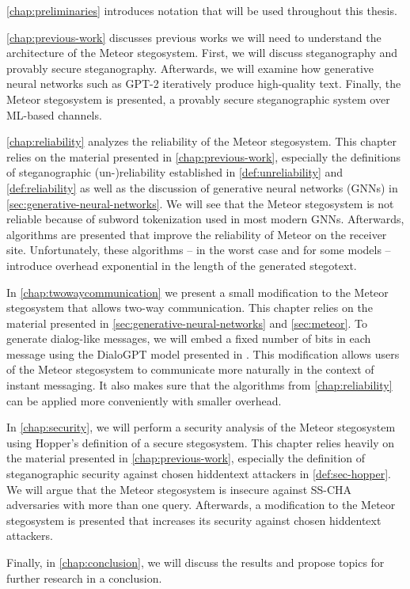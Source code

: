 \autoref{chap:preliminaries} introduces notation that will be used throughout this thesis.

\autoref{chap:previous-work} discusses previous works we will need to understand the architecture of the Meteor stegosystem.
First, we will discuss steganography and provably secure steganography.
Afterwards, we will examine how generative neural networks such as GPT-2 iteratively produce high-quality text.
Finally, the Meteor stegosystem is presented, a provably secure steganographic system over ML-based channels.

\autoref{chap:reliability} analyzes the reliability of the Meteor stegosystem. 
This chapter relies on the material presented in \autoref{chap:previous-work}, especially the definitions of steganographic (un-)reliability established in \autoref{def:unreliability} and \autoref{def:reliability} as well as the discussion of generative neural networks (GNNs) in \autoref{sec:generative-neural-networks}.
We will see that the Meteor stegosystem is not reliable because of subword tokenization used in most modern GNNs.
Afterwards, algorithms are presented that improve the reliability of Meteor on the receiver site.
Unfortunately, these algorithms -- in the worst case and for some models -- introduce overhead exponential in the length of the generated stegotext.

In \autoref{chap:twowaycommunication} we present a small modification to the Meteor stegosystem that allows two-way communication.
This chapter relies on the material presented in \autoref{sec:generative-neural-networks} and \autoref{sec:meteor}.
To generate dialog-like messages, we will embed a fixed number of bits in each message using the DialoGPT model presented in \cite{Zhang2020}.
This modification allows users of the Meteor stegosystem to communicate more naturally in the context of instant messaging.
It also makes sure that the algorithms from \autoref{chap:reliability} can be applied more conveniently with smaller overhead.

In \autoref{chap:security}, we will perform a security analysis of the Meteor stegosystem using Hopper's definition of a secure stegosystem.
This chapter relies heavily on the material presented in \autoref{chap:previous-work}, especially the definition of steganographic security against chosen hiddentext attackers in \autoref{def:sec-hopper}.
We will argue that the Meteor stegosystem is insecure against SS-CHA adversaries with more than one query.
Afterwards, a modification to the Meteor stegosystem is presented that increases its security against chosen hiddentext attackers.

Finally, in \autoref{chap:conclusion}, we will discuss the results and propose topics for further research in a conclusion.
